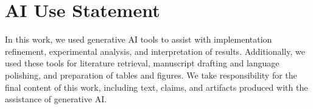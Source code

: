 \section*{AI Use Statement}

In this work, we used generative AI tools to assist with implementation
refinement, experimental analysis, and interpretation of results.
Additionally, we used these tools for literature retrieval, manuscript
drafting and language polishing, and preparation of tables and figures.
We take responsibility for the final
content of this work, including text, claims, and artifacts produced with
the assistance of generative AI.
